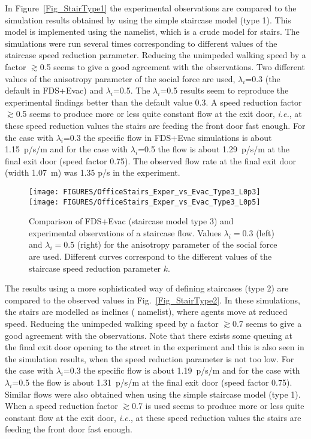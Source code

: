 \documentclass[12pt,a4paper,final,twoside]{stylevk}
\begin{document}
\begin{enumerate}
In Figure~\ref{Fig_StairType1} the experimental observations are
compared to the simulation results obtained by using the simple
staircase model (type 1).  This model is implemented using the
 namelist, which is a crude model for stairs.  The
simulations were run several times corresponding to different values
of the staircase speed reduction parameter.  Reducing the unimpeded
walking speed by a factor $\gtrsim$0.5 seems to give a good agreement
with the observations.  Two different values of the anisotropy
parameter of the social force are used, $\lambda_i$=0.3 (the default
in FDS+Evac) and $\lambda_i$=0.5.  The $\lambda_i$=0.5 results seem to
reproduce the experimental findings better than the default value 0.3.
A speed reduction factor $\gtrsim$0.5 seems to produce more or less
quite constant flow at the exit door, \emph{i.e.}, at these speed
reduction values the stairs are feeding the front door fast enough.
For the case with $\lambda_i$=0.3 the specific flow in FDS+Evac
simulations is about 1.15~p/s/m and for the case with $\lambda_i$=0.5
the flow is about 1.29~p/s/m at the final exit door (speed factor
0.75).  The observed flow rate at the final exit door (width 1.07~m)
was 1.35 p/s in the experiment.
%

%
\begin{figure}[!tb]
  \centerline{\texttt{[image: FIGURES/OfficeStairs\_Exper\_vs\_Evac\_Type3\_L0p3]}\texttt{[image: FIGURES/OfficeStairs\_Exper\_vs\_Evac\_Type3\_L0p5]}}
  \caption{Comparison of FDS+Evac (staircase model type 3) and
    experimental observations of a staircase flow.  Values
    $\lambda_i=0.3$ (left) and $\lambda_i=0.5$ (right) for the
    anisotropy parameter of the social force are used.  Different
    curves correspond to the different values of the staircase speed
    reduction parameter $k$.}\label{Fig_StairType3}
\end{figure}

The results using a more sophisticated way of defining staircases
(type 2) are compared to the observed values in
Fig.~\ref{Fig_StairType2}.  In these simulations, the stairs are
modelled as inclines ( namelist), where agents move at
reduced speed.  Reducing the unimpeded walking speed by a factor
$\gtrsim$0.7 seems to give a good agreement with the observations.
Note that there exists some queuing at the final exit door opening to
the street in the experiment and this is also seen in the simulation
results, when the speed reduction parameter is not too low.  For the
case with $\lambda_i$=0.3 the specific flow is about 1.19~p/s/m and
for the case with $\lambda_i$=0.5 the flow is about 1.31~p/s/m at the
final exit door (speed factor 0.75).  Similar flows were also obtained
when using the simple staircase model (type 1).  When a speed
reduction factor $\gtrsim$0.7 is used seems to produce more or less
quite constant flow at the exit door, \emph{i.e.}, at these speed
reduction values the stairs are feeding the front door fast enough.
%



\end{enumerate}
\end{document}
